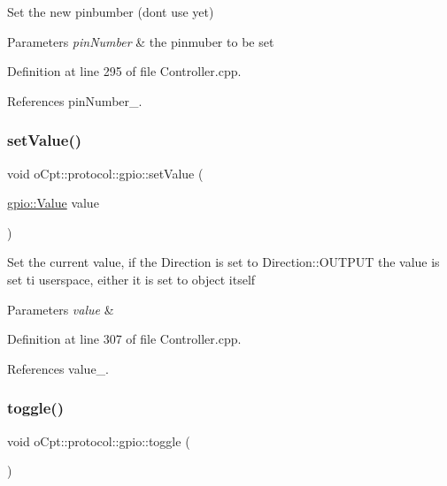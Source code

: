 Set the new pinbumber (don\textquotesingle{}t use yet) 
\begin{DoxyParams}{Parameters}
{\em pin\+Number} & the pinmuber to be set \\
\hline
\end{DoxyParams}


Definition at line 295 of file Controller.\+cpp.



References pin\+Number\+\_\+.

\hypertarget{classo_cpt_1_1protocol_1_1gpio_a869cfd12f0b74afedb7dbb40eacfa402}{}\label{classo_cpt_1_1protocol_1_1gpio_a869cfd12f0b74afedb7dbb40eacfa402} 
\subsubsection{\texorpdfstring{set\+Value()}{setValue()}}
{\footnotesize\ttfamily void o\+Cpt\+::protocol\+::gpio\+::set\+Value (\begin{DoxyParamCaption}\item[{\hyperlink{classo_cpt_1_1protocol_1_1gpio_a7d2d1d34f177f209ad642098d168656f}{gpio\+::\+Value}}]{value }\end{DoxyParamCaption})}

Set the current value, if the Direction is set to Direction\+::\+O\+U\+T\+P\+UT the value is set ti userspace, either it is set to object itself 
\begin{DoxyParams}{Parameters}
{\em value} & \\
\hline
\end{DoxyParams}


Definition at line 307 of file Controller.\+cpp.



References value\+\_\+.

\hypertarget{classo_cpt_1_1protocol_1_1gpio_a12c30093a002734375b29de19809aab0}{}\label{classo_cpt_1_1protocol_1_1gpio_a12c30093a002734375b29de19809aab0} 
\subsubsection{\texorpdfstring{toggle()}{toggle()}}
{\footnotesize\ttfamily void o\+Cpt\+::protocol\+::gpio\+::toggle (\begin{DoxyParamCaption}{ }\end{DoxyParamCaption})}


